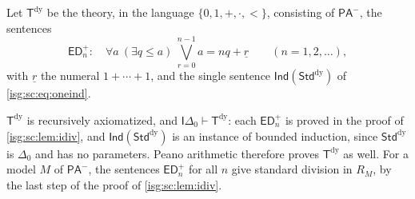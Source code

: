 \documentclass[11pt]{article}
\theoremstyle{definition}
\theoremstyle{remark}
\newcommand{\StdDy}{\mathsf{Std}^{\mathrm{dy}}}
\newcommand{\Tdy}{\mathsf{T}^{\mathrm{dy}}}
\newcommand{\Ind}{\mathsf{Ind}}
\newcommand{\ED}{\mathsf{ED}}
\newcommand{\Idelta}{\mathsf{I}\Delta_0}
\newcommand{\PAminus}{\mathsf{PA}^{-}}
\begin{document}
\begin{definition}\label{isg:sc:def:Tdy}
Let $\Tdy$ be the theory, in the language $\{0,1,+,\cdot,<\}$, consisting
of $\PAminus$, the sentences
\[
 \ED_n^+:\quad \forall a\ (\exists q\le a)\
 \bigvee_{r=0}^{n-1}a=nq+\underline r\qquad(n=1,2,\ldots),
\]
with $\underline r$ the numeral $1+\cdots+1$, and the single sentence
$\Ind(\StdDy)$ of \eqref{isg:sc:eq:oneind}.
\end{definition}

$\Tdy$ is recursively axiomatized, and $\Idelta\vdash\Tdy$: each
$\ED_n^+$ is proved in the proof of \cref{isg:sc:lem:idiv}, and
$\Ind(\StdDy)$ is an instance of bounded induction, since $\StdDy$ is
$\Delta_0$ and has no parameters. Peano arithmetic therefore proves $\Tdy$
as well. For a model $M$ of $\PAminus$, the sentences $\ED_n^+$ for all
$n$ give standard division in $R_M$, by the last step of the proof of
\cref{isg:sc:lem:idiv}.
\end{document}
